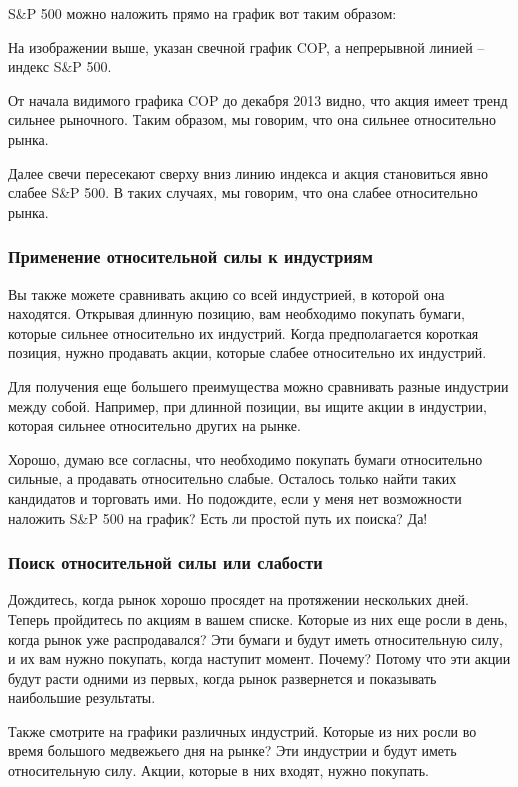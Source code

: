 \documentclass{book}
\begin{document}
S\&P 500 можно наложить прямо на график вот таким образом:

На изображении выше, указан свечной график COP, а непрерывной линией – индекс S\&P 500.

От начала видимого графика COP до декабря 2013 видно, что акция имеет тренд сильнее рыночного. Таким образом, мы говорим, что она сильнее относительно рынка.

Далее свечи пересекают сверху вниз линию индекса и акция становиться
явно слабее S\&P 500. В таких случаях, мы говорим, что она слабее
относительно рынка.

\subsubsection{Применение относительной силы к индустриям}

Вы также можете сравнивать акцию со всей индустрией, в которой она находятся. Открывая длинную позицию, вам необходимо покупать бумаги, которые сильнее относительно их индустрий. Когда предполагается короткая позиция, нужно продавать акции, которые слабее относительно их индустрий.

Для получения еще большего преимущества можно сравнивать разные индустрии между собой. Например, при длинной позиции, вы ищите акции в индустрии, которая сильнее относительно других на рынке.

Хорошо, думаю все согласны, что необходимо покупать бумаги относительно сильные, а продавать относительно слабые. Осталось только найти таких кандидатов и торговать ими. Но подождите, если у меня нет возможности наложить S\&P 500 на график? Есть ли простой путь их поиска? Да!

\subsubsection{Поиск относительной силы или слабости}

Дождитесь, когда рынок хорошо просядет на протяжении нескольких дней. Теперь пройдитесь по акциям в вашем списке. Которые из них еще росли в день, когда рынок уже распродавался? Эти бумаги и будут иметь относительную силу, и их вам нужно покупать, когда наступит момент. Почему? Потому что эти акции будут расти одними из первых, когда рынок развернется и показывать наибольшие результаты.

Также смотрите на графики различных индустрий. Которые из них росли во время большого медвежьего дня на рынке? Эти индустрии и будут иметь относительную силу. Акции, которые в них входят, нужно покупать.
\end{document}
